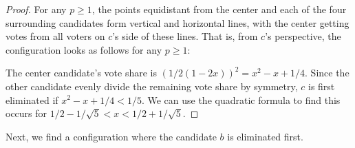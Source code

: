 \documentclass{article}
\theoremstyle{theorem}
\theoremstyle{definition}
\begin{document}
\begin{proof}
For any $p \ge 1$, the points equidistant from the center and each of the four surrounding candidates form vertical and horizontal lines, with the center getting votes from all voters on $c$'s side of these lines. That is, from $c$'s perspective, the configuration looks as follows for any $p \ge 1$:
  \begin{center}
  \end{center}
  
  The center candidate's vote share is $(1/2(1-2x))^2 = x^2 - x + 1/4$. Since the other candidate evenly divide the remaining vote share by symmetry, $c$ is first eliminated if $    x^2 - x + 1/4 < 1/5$. We can use the quadratic formula to find this occurs for $ 1/2 -  1/\sqrt{5} < x < 1/2 + 1/\sqrt{5}$. 
\end{proof}

Next, we find a configuration where the candidate $b$ is eliminated first.
\end{document}
